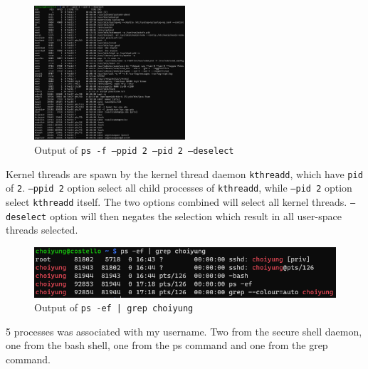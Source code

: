\documentclass{article}
\begin{document}
\newpage
\begin{figure}[H]
  \caption{Output of \texttt{ps -f --ppid 2 --pid 2 --deselect}}
  \centering
  \includegraphics[width=0.5\textwidth]{ECE4310_proj1_part2_deselect.png}
\end{figure}
Kernel threads are spawn by the kernel thread daemon \texttt{kthreadd}, which have \texttt{pid} of \texttt{2}.
\texttt{--ppid 2} option select all child processes of \texttt{kthreadd}, while \texttt{--pid 2} option select \texttt{kthreadd} itself. 
The two options combined will select all kernel threads. \texttt{--deselect} option will then negates the selection which result in all user-space threads selected.
\begin{figure}[H]
  \caption{Output of \texttt{ps -ef | grep choiyung}}
  \centering
  \includegraphics[width=\textwidth]{ECE4310_proj1_part2_grep.png}
\end{figure}
5 processes was associated with my username. Two from the secure shell daemon, one from the bash shell, one from the ps command and one from the grep command. 
\end{document}
